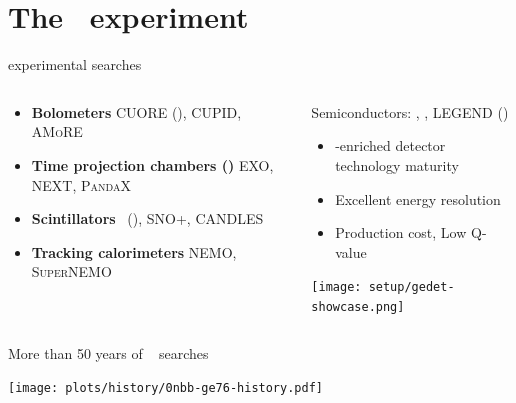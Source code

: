 \documentclass[10pt,aspectratio=169]{beamer}
\newcommand{\cmark}{\textcolor{mLightGreen}{\ding{51}}}
\newcommand{\xmark}{\textcolor{mLightBrown}{\ding{55}}}
\begin{document}
\section{The \gerda\ experiment}
\begin{frame}{\texorpdfstring{\onbb}{0νββ} experimental searches}
  \begin{columns}
    \begin{column}{0.5\textwidth}
      \begin{itemize}
        \item \textbf{Bolometers} CUORE (), CUPID, \textsc{AMoRE}
        \item \textbf{Time projection chambers ()} EXO, NEXT, \textsc{PandaX}
        \item \textbf{Scintillators} \kamlandzen\ (), SNO+, CANDLES
        \item \textbf{Tracking calorimeters} NEMO, \textsc{SuperNEMO}
      \end{itemize}
    \end{column}
    \begin{column}{0.5\textwidth}
      \begin{alertblock}{Semiconductors: \gerda, \majoranademo, LEGEND (\gesix)}
        \begin{itemize}\small
          \item[\cmark] \gesix-enriched detector technology maturity
          \item[\cmark] Excellent energy resolution
          \item[\xmark] Production cost, Low Q-value
        \end{itemize}
      \end{alertblock}
      \begin{center}
        \texttt{[image: setup/gedet-showcase.png]}
      \end{center}
    \end{column}
  \end{columns}
\end{frame}
\begin{frame}{More than 50 years of \gesix\ \texorpdfstring{\onbb}{0νββ} searches}
  \begin{center}
    \texttt{[image: plots/history/0nbb-ge76-history.pdf]}
  \end{center}
\end{frame}
\end{document}
